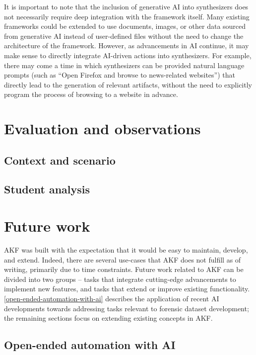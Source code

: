 \documentclass[letterpaper,12pt]{report}
\begin{document}
It is important to note that the inclusion of generative AI into
synthesizers does not necessarily require deep integration with the
framework itself. Many existing frameworks could be extended to use
documents, images, or other data sourced from generative AI instead of
user-defined files without the need to change the architecture of the
framework. However, as advancements in AI continue, it may make sense to
directly integrate AI-driven actions into synthesizers. For example,
there may come a time in which synthesizers can be provided natural
language prompts (such as ``Open Firefox and browse to news-related
websites'') that directly lead to the generation of relevant artifacts,
without the need to explicitly program the process of browsing to a
website in advance.

\chapter{Evaluation and observations}\label{chapter-seven}

\section{Context and scenario}\label{context-and-scenario}

\section{Student analysis}\label{student-analysis}

\chapter{Future work}\label{chapter-eight}

AKF was built with the expectation that it would be easy to maintain,
develop, and extend. Indeed, there are several use-cases that AKF does
not fulfill as of writing, primarily due to time constraints. Future
work related to AKF can be divided into two groups -- tasks that
integrate cutting-edge advancements to implement new features, and tasks
that extend or improve existing functionality. \autoref{open-ended-automation-with-ai} describes the application of recent AI
developments towards addressing tasks relevant to forensic dataset
development; the remaining sections focus on extending existing concepts
in AKF.

\section{Open-ended automation with
AI}\label{open-ended-automation-with-ai}
\end{document}
